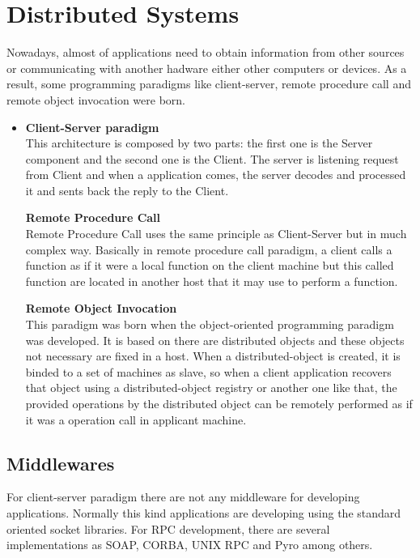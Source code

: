 \section{Distributed Systems}
Nowadays, almost of applications need to obtain information from other sources
or communicating with another hadware either other computers or devices. As a
result, some programming paradigms like client-server, remote procedure call and
remote object invocation were born.
\begin{itemize}
\item \textbf{Client-Server paradigm}~\\
This architecture is composed by two parts: the first one is the Server
component and the second one is the Client. The server is listening request from
Client and when a application comes, the server decodes and processed it and
sents back the reply to the Client.

\textbf{Remote Procedure Call}~\\
Remote Procedure Call uses the same principle as Client-Server but in much
complex way. Basically in remote procedure call paradigm, a client calls a
function as if it were a local function on the client machine but this called
function are located in another host that it may use to perform a function.

\textbf{Remote Object Invocation}~\\
This paradigm was born when the object-oriented programming paradigm was
developed. It is based on there are distributed objects and these objects not
necessary are fixed in a host. When a distributed-object is created, it is
binded to a set of machines as slave, so when a client application recovers that
object using a distributed-object registry or another one like that, the
provided operations by the distributed object can be remotely performed as if
it was a  operation call in applicant machine.
\end{itemize}
\subsection{Middlewares}

For client-server paradigm there are not any middleware for developing
applications. Normally this kind applications are developing using the standard
oriented socket libraries.
For \ac{RPC} development, there are several implementations as
\ac{SOAP}, \ac{CORBA}, UNIX \ac{RPC} and Pyro among others.

